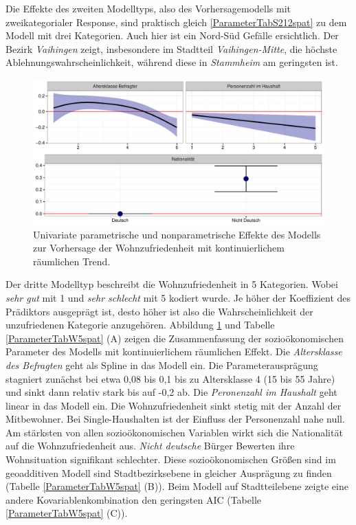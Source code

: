\documentclass{Vorlage}
\begin{document}
Die Effekte des zweiten Modelltyps, also des Vorhersagemodells mit zweikategorialer Response, sind praktisch gleich \ref{ParameterTabS212spat} zu dem Modell mit drei Kategorien. Auch hier ist ein Nord-Süd Gefälle ersichtlich. Der Bezirk \textit{Vaihingen} zeigt, insbesondere im Stadtteil \textit{Vaihingen-Mitte}, die höchste Ablehnungswahrscheinlichkeit, während diese in \textit{Stammheim} am geringsten ist.\\
\begin{figure}[h]
 \begin{center}
 \includegraphics[scale=0.8]{Pictures/BWModelEffects2}
 \caption{Univariate parametrische und nonparametrische Effekte des Modells zur Vorhersage der Wohnzufriedenheit mit kontinuierlichem räumlichen Trend.}
 \label{BWParam}
 \end{center}
\end{figure}
Der dritte Modelltyp beschreibt die Wohnzufriedenheit in 5 Kategorien. Wobei \textit{sehr gut} mit 1 und \textit{sehr schlecht} mit 5 kodiert wurde. Je höher der Koeffizient des Prädiktors ausgeprägt ist, desto höher ist also die Wahrscheinlichkeit der unzufriedenen Kategorie anzugehören. Abbildung \ref{BWParam} und Tabelle \ref{ParameterTabW5spat} (A) zeigen die Zusammenfassung der sozioökonomischen Parameter des Modells mit kontinuierlichem räumlichen Effekt. Die \textit{Altersklasse des Befragten} geht als Spline in das Modell ein. Die Parameterausprägung stagniert zunächst bei etwa 0,08 bis 0,1 bis zu Altersklasse 4 (15 bis 55 Jahre) und sinkt dann relativ stark bis auf -0,2 ab. Die \textit{Peronenzahl im Haushalt} geht linear in das Modell ein. Die Wohnzufriedenheit sinkt stetig mit der Anzahl der Mitbewohner. Bei Single-Haushalten ist der Einfluss der Personenzahl nahe null. Am stärksten von allen sozioökonomischen Variablen wirkt sich die Nationalität auf die Wohnzufriedenheit aus. \textit{Nicht deutsche} Bürger Bewerten ihre Wohnsituation signifikant schlechter. Diese  sozioökonomischen Größen sind im geoadditiven Modell sind Stadtbezirksebene in gleicher Ausprägung zu finden (Tabelle \ref{ParameterTabW5spat} (B)). Beim Modell auf Stadtteilebene zeigte eine andere Kovariablenkombination den geringsten AIC (Tabelle \ref{ParameterTabW5spat} (C)).\\
\end{document}
